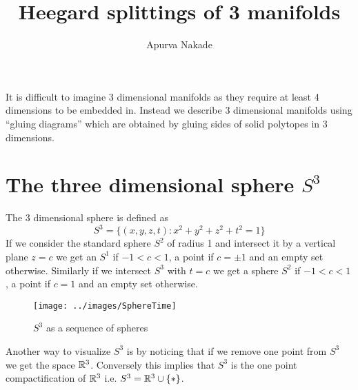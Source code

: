 \iffalse
It's unfair to say that mathematicians aren't real doctors, we perform surgeries all the time. In this class we'll introduce the notion of a topological manifold via simplicial (delta) complexes. Spend a day or two doing examples and go over several notions like orientation, cobordism and of course surgery.

Keywords: simplicial complex, manifold, orientation, cobordism, surgery

Type: Lecture
Homework: Recommended
Prereqs: None
\fi





\title{Heegard splittings of 3 manifolds}
\author{Apurva Nakade}
\thispagestyle{fancy}
\maketitle


It is difficult to imagine 3 dimensional manifolds as they require at least 4 dimensions to be embedded in. Instead we describe 3 dimensional manifolds using ``gluing diagrams'' which are obtained by gluing sides of solid polytopes in 3 dimensions.

\section{The three dimensional sphere $S^3$}
The 3 dimensional sphere is defined as $$S^3 = \{ (x,y,z,t) : x^2 + y^2 + z ^{2} + t ^{2} = 1  \}$$ If we consider the standard sphere $S^2$ of radius 1 and intersect it by a vertical plane $z = c$ we get an $S^1$ if $-1 < c < 1 $, a point if $c = \pm 1$ and an empty set otherwise. Similarly if we intersect $S^3$ with $t=c$ we get a sphere $S^2$ if $ -1 < c < 1$, a point if $c=1$ and an empty set otherwise.

\begin{figure}[H]
	\centering
	\texttt{[image: ../images/SphereTime]}
	\caption{$S^3$ as a sequence of spheres}
\end{figure}


Another way to visualize $S^3$ is by noticing that if we remove one point from $S^3$ we get the space $\mathbb{R}^3$. Conversely this implies that $S^3$ is the one point compactification of $\mathbb{R}^3$ i.e. $S^3 = \mathbb{R}^3 \cup \{ *\}$.


